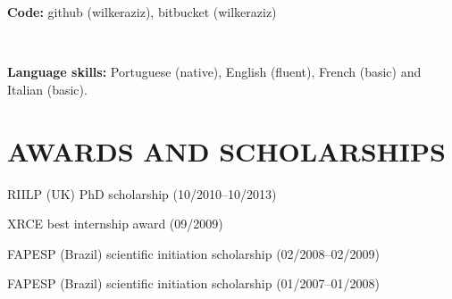 {\bf Code:} github (wilkeraziz), bitbucket (wilkeraziz)

~

{\bf Language skills:} Portuguese (native), English (fluent), French (basic) and Italian (basic).

\section*{AWARDS AND SCHOLARSHIPS}
\begin{description}
	\item RIILP (UK) PhD scholarship (10/2010--10/2013)
	\item XRCE best internship award (09/2009)
	\item FAPESP (Brazil) scientific initiation scholarship (02/2008--02/2009)
	\item FAPESP (Brazil) scientific initiation scholarship (01/2007--01/2008)
\end{description}
